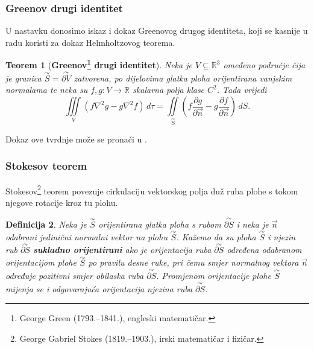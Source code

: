 \documentclass[12pt,a4paper]{article}
\makeatletter
\newtheorem{tm}{Teorem}[section]
\newtheorem{deff}[tm]{Definicija}
\renewenvironment{proof}[1][\proofname]{\par
  \pushQED{\qed}%
  \normalfont
  \topsep6\p@\@plus6\p@\relax
  \trivlist
  \item[\hskip\labelsep
  \bfseries #1\@addpunct{.}]\ignorespaces
}{%
  \popQED\endtrivlist\@endpefalse
}
\makeatother
\begin{document}
\subsubsection{Greenov drugi identitet}

U nastavku donosimo iskaz i dokaz Greenovog drugog identiteta, koji se kasnije u radu koristi za dokaz Helmholtzovog teorema.

\begin{tm}[\textbf{Greenov\footnote{George Green (1793.--1841.), engleski matematičar.} drugi identitet}]
Neka je $V\subseteq\mathbb{R}^3$ omeđeno područje čija je granica
$\overset{\curvearrowright}{S}=\overset{\curvearrowright}{\partial V}$ zatvorena, po dijelovima glatka ploha orijentirana
vanjskim normalama te neka su $f,g:V\to\mathbb{R}$ skalarna polja klase
$C^2$. Tada vrijedi
$$
\iiint\limits_V
\left(
f\nabla^2g-g\nabla^2f
\right)\,d\tau
=
\iint\limits_{\overset{\curvearrowright}{S}}
\left(
f\frac{\partial g}{\partial \overrightarrow{n}}
-
g\frac{\partial f}{\partial \overrightarrow{n}}
\right)\,dS.
$$
\end{tm}

\begin{proof}
Dokaz ove tvrdnje može se pronaći u \cite{daners}.
\end{proof}


\subsubsection{Stokesov teorem}

Stokesov\footnote{George Gabriel Stokes (1819.--1903.), irski matematičar i fizičar.} teorem povezuje cirkulaciju vektorskog polja duž ruba plohe
s tokom njegove rotacije kroz tu plohu.

\begin{deff}
Neka je $\overset{\curvearrowright}{S}$ orijentirana glatka ploha s rubom $\overset{\curvearrowright}{\partial S}$ i neka je
$\overrightarrow{n}$ odabrani jedinični normalni vektor na plohu $\overset{\curvearrowright}{S}$.
Kažemo da su ploha $\overset{\curvearrowright}{S}$ i njezin rub $\overset{\curvearrowright}{\partial S}$
\textbf{\textit{sukladno orijentirani}} ako je orijentacija ruba
$\overset{\curvearrowright}{\partial S}$ određena odabranom orijentacijom plohe $\overset{\curvearrowright}{S}$ po pravilu
desne ruke, pri čemu smjer normalnog vektora $\overrightarrow{n}$
određuje pozitivni smjer obilaska ruba $\overset{\curvearrowright}{\partial S}$.
Promjenom orijentacije plohe $\overset{\curvearrowright}{S}$ mijenja se i odgovarajuća orijentacija
njezina ruba $\overset{\curvearrowright}{\partial S}$.
\end{deff}
\end{document}
